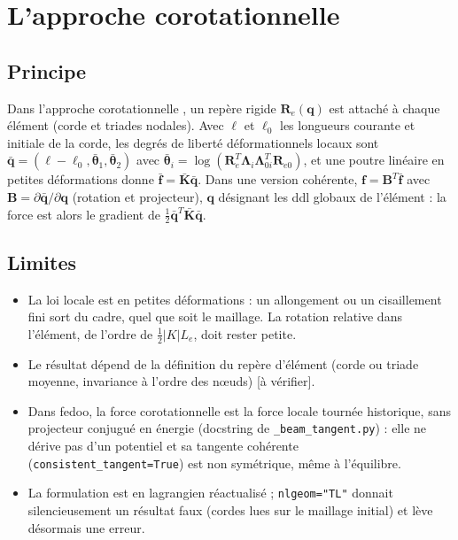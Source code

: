 \documentclass[11pt,a4paper]{article}
\newcommand{\Lam}{\bm{\Lambda}}
\newcommand{\code}[1]{\texttt{#1}}
\newcommand{\averif}{\textcolor{orange!80!black}{[à vérifier]}}
\begin{document}
\section{L'approche corotationnelle}

\subsection{Principe}
Dans l'approche corotationnelle \cite{belytschko1973,rankin1986,crisfield1990,nouromid1991,crisfield1997,battini2002,felippa2005},
un repère rigide $\mathbf R_e(\mathbf q)$ est attaché à chaque élément (corde et
triades nodales). Avec $\ell$ et $\ell_0$ les longueurs courante et initiale de la
corde, les degrés de liberté déformationnels locaux sont
$\bar{\mathbf q}=(\ell-\ell_0,\bar{\bm\theta}_1,\bar{\bm\theta}_2)$ avec
$\bar{\bm\theta}_i=\log(\mathbf R_e^T\Lam_i\Lam_{0i}^T\mathbf R_{e0})$, et une
poutre linéaire en petites déformations donne $\bar{\mathbf f}=\bar{\mathbf K}\bar{\mathbf q}$.
Dans une version cohérente, $\mathbf f=\mathbf B^T\bar{\mathbf f}$ avec
$\mathbf B=\partial\bar{\mathbf q}/\partial\mathbf q$ (rotation et projecteur),
$\mathbf q$ désignant les ddl globaux de l'élément :
la force est alors le gradient de $\tfrac12\bar{\mathbf q}^T\bar{\mathbf K}\bar{\mathbf q}$.

\subsection{Limites}
\begin{itemize}
\item La loi locale est en petites déformations : un allongement ou un
cisaillement fini sort du cadre, quel que soit le maillage. La rotation relative
dans l'élément, de l'ordre de $\tfrac12|K|L_e$, doit rester petite.
\item Le résultat dépend de la définition du repère d'élément (corde ou triade
moyenne, invariance à l'ordre des nœuds) \cite{felippa2005} \averif.
\item Dans fedoo, la force corotationnelle est la force locale tournée
historique, sans projecteur conjugué en énergie (docstring de
\code{\_beam\_tangent.py}) : elle ne dérive pas d'un potentiel et sa tangente
cohérente (\code{consistent\_tangent=True}) est non symétrique, même à
l'équilibre.
\item La formulation est en lagrangien réactualisé ; \code{nlgeom="TL"}
donnait silencieusement un résultat faux (cordes lues sur le maillage initial)
et lève désormais une erreur.
\end{itemize}
\end{document}
